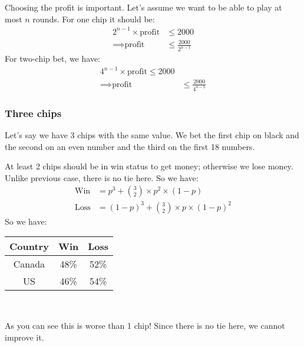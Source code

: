 \documentclass{book}
\begin{document}
	\par
	Choosing the profit is important. Let's assume we want to be able to play at most $n$ rounds. For one chip it should be:
	\begin{equation*}
		\begin{split}
			2^{n - 1} \times \text{profit} &\le 2000 \\
			\implies \text{profit} &\le \frac{2000}{2^{n - 1}}			
		\end{split}
	\end{equation*}
	For two-chip bet, we have:
	\begin{equation*}
		\begin{split}
			4^{n - 1} \times \text{profit} \le 2000 \\
			\implies \text{profit} &\le \frac{2000}{4^{n -1}}
		\end{split}
	\end{equation*}
	\subsubsection{Three chips}
	Let's say we have 3 chips with the same value. We bet the first chip on black and the second on an even number and the third on the first 18 numbers.
	\par At least 2 chips should be in win status to get money; otherwise we lose money. Unlike previous case, there is no tie here. So we have:
	\begin{equation*}
		\begin{split}
			\text{Win} &= p^3 + \binom{3}{2} \times p^2 \times (1 - p) \\
			\text{Loss} &= (1 - p)^3 + \binom{3}{2} \times p \times (1 - p)^2
		\end{split}
	\end{equation*}
	So we have: \\
	\par
	\begin{tabular}[h!]{c c c}
	\toprule
	Country & Win & Loss \\
	\midrule
	Canada & 48\% & 52\% \\
	US & 46\% & 54\% \\
	\bottomrule
\end{tabular} \\
	\par
	\par As you can see this is worse than 1 chip! Since there is no tie here, we cannot improve it.
\end{document}
